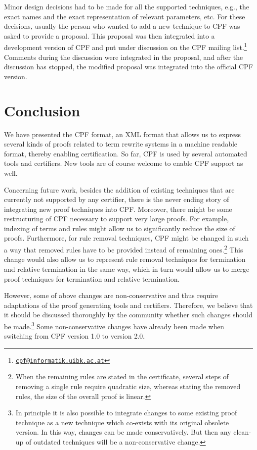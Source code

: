 \documentclass[USenglish]{eptcs}
\begin{document}
Minor design decisions had to be made for all the supported 
techniques,
e.g., the exact names and the exact representation of relevant parameters, etc.
For these decisions, usually the person who wanted to add a new technique to CPF was
asked to provide a proposal. This proposal was then integrated into a development 
version of CPF and put under discussion on the CPF mailing list.\footnote{\href{mailto:cpf@informatik.uibk.ac.at}{\nolinkurl{cpf@informatik.uibk.ac.at}}}
Comments during
the discussion were integrated in the proposal, 
and after the discussion has stopped, the modified proposal was
integrated into the official CPF version. 


\section{Conclusion}

We have presented the CPF format, an XML format that allows us to express
several kinds of proofs related to term rewrite systems in a machine readable
format, thereby enabling certification.  So far, CPF is used by several
automated tools and certifiers. New tools are of course welcome to enable CPF
support as well.

Concerning future work, besides the addition of existing techniques that are
currently not supported by any certifier, there is the never ending story of
integrating new proof techniques into CPF.
Moreover, there might be some restructuring of CPF necessary to support very
large proofs. For example, indexing of terms and rules might allow us to
significantly reduce the size of proofs.
Furthermore, for rule removal techniques, CPF might be changed in such a way
that removed rules have to be provided instead of remaining
ones.\footnote{When the remaining rules are stated in the certificate, several
steps of removing a single rule require quadratic size, whereas stating the
removed rules, the size of the overall proof is linear.}
This change would also allow us to represent rule removal techniques for
termination and relative termination in the same way, which in turn would allow
us to merge proof techniques for termination and relative termination. 

However, some of above changes are non-conservative and thus require adaptations
of the proof generating tools and certifiers. Therefore, we believe that it
should be discussed thoroughly by the community whether such changes should be
made.\footnote{In principle it is also possible to integrate changes to some
existing proof technique as a new technique which co-exists with its original
obsolete version. In this way, changes can be made conservatively. But then any
clean-up of outdated techniques will be a non-conservative change.} Some
non-conservative changes have already been made when switching from CPF version
1.0 to version 2.0. 
\end{document}
